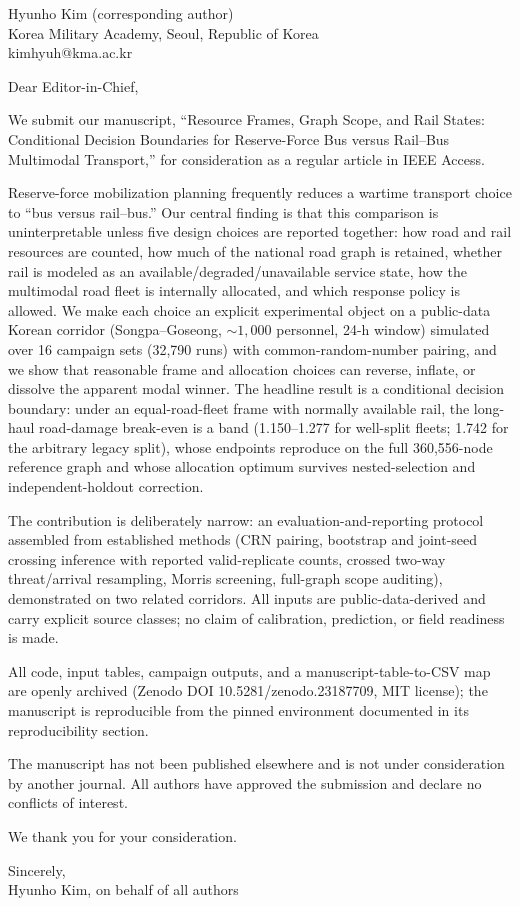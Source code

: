 \documentclass[11pt]{article}
\begin{document}
\begin{flushright}
Hyunho Kim (corresponding author)\\
Korea Military Academy, Seoul, Republic of Korea\\
kimhyuh@kma.ac.kr
\end{flushright}

\bigskip
Dear Editor-in-Chief,

\medskip
We submit our manuscript, ``Resource Frames, Graph Scope, and Rail States: Conditional Decision Boundaries for Reserve-Force Bus versus Rail--Bus Multimodal Transport,'' for consideration as a regular article in IEEE Access.

\medskip
Reserve-force mobilization planning frequently reduces a wartime transport choice to ``bus versus rail--bus.'' Our central finding is that this comparison is uninterpretable unless five design choices are reported together: how road and rail resources are counted, how much of the national road graph is retained, whether rail is modeled as an available/degraded/unavailable service state, how the multimodal road fleet is internally allocated, and which response policy is allowed. We make each choice an explicit experimental object on a public-data Korean corridor (Songpa--Goseong, ${\sim}1{,}000$ personnel, 24-h window) simulated over 16 campaign sets (32,790 runs) with common-random-number pairing, and we show that reasonable frame and allocation choices can reverse, inflate, or dissolve the apparent modal winner. The headline result is a conditional decision boundary: under an equal-road-fleet frame with normally available rail, the long-haul road-damage break-even is a band (1.150--1.277 for well-split fleets; 1.742 for the arbitrary legacy split), whose endpoints reproduce on the full 360,556-node reference graph and whose allocation optimum survives nested-selection and independent-holdout correction.

\medskip
The contribution is deliberately narrow: an evaluation-and-reporting protocol assembled from established methods (CRN pairing, bootstrap and joint-seed crossing inference with reported valid-replicate counts, crossed two-way threat/arrival resampling, Morris screening, full-graph scope auditing), demonstrated on two related corridors. All inputs are public-data-derived and carry explicit source classes; no claim of calibration, prediction, or field readiness is made.

\medskip
All code, input tables, campaign outputs, and a manuscript-table-to-CSV map are openly archived (Zenodo DOI 10.5281/zenodo.23187709, MIT license); the manuscript is reproducible from the pinned environment documented in its reproducibility section.

\medskip
The manuscript has not been published elsewhere and is not under consideration by another journal. All authors have approved the submission and declare no conflicts of interest.

\medskip
We thank you for your consideration.

\bigskip
Sincerely,\\
Hyunho Kim, on behalf of all authors
\end{document}
